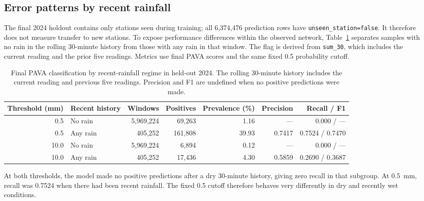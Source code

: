 \subsection{Error patterns by recent rainfall}
The final 2024 holdout contains only stations seen during training; all
6,374,476 prediction rows have \texttt{unseen\_station=false}. It therefore
does not measure transfer to new stations. To expose performance differences
within the observed network, Table~\ref{tab:onset} separates samples with no
rain in the rolling 30-minute history from those with any rain in that window.
The flag is derived from \texttt{sum\_30}, which includes the current reading
and the prior five readings. Metrics use final PAVA scores and the same fixed
0.5 probability cutoff.

\begin{table}[htbp]
\centering\scriptsize
\caption{Final PAVA classification by recent-rainfall regime in held-out
2024. The rolling 30-minute history includes the current reading and previous
five readings. Precision and F1 are undefined when no positive predictions
were made.}
\label{tab:onset}
\begin{tabular}{r l r r r r r}
\toprule
Threshold (mm) & Recent history & Windows & Positives & Prevalence (\%) &
Precision & Recall / F1 \\
\midrule
0.5 & No rain & 5,969,224 & 69,263 & 1.16 & --- & 0.000 / --- \\
0.5 & Any rain & 405,252 & 161,808 & 39.93 & 0.7417 & 0.7524 / 0.7470 \\
10.0 & No rain & 5,969,224 & 6,894 & 0.12 & --- & 0.000 / --- \\
10.0 & Any rain & 405,252 & 17,436 & 4.30 & 0.5859 & 0.2690 / 0.3687 \\
\bottomrule
\end{tabular}
\end{table}

At both thresholds, the model made no positive predictions after a dry
30-minute history, giving zero recall in that subgroup. At 0.5~mm, recall was
0.7524 when there had been recent rainfall. The fixed 0.5 cutoff therefore
behaves very differently in dry and recently wet conditions.

